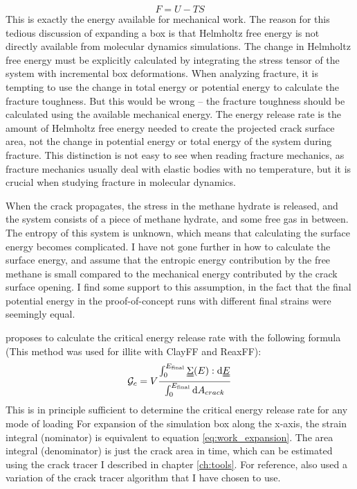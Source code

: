 \begin{equation}
	F = U - TS
\end{equation}
%
This is exactly the energy available for mechanical work. The reason for this tedious discussion of expanding a box is that Helmholtz free energy is not directly available from molecular dynamics simulations. The change in Helmholtz free energy must be explicitly calculated by integrating the stress tensor of the system with incremental box deformations. When analyzing fracture, it is tempting to use the change in total energy or potential energy to calculate the fracture toughness. But this would be wrong -- the fracture toughness should be calculated using the available mechanical energy. The energy release rate is the amount of Helmholtz free energy needed to create the projected crack surface area, not the change in potential energy or total energy of the system during fracture. This distinction is not easy to see when reading fracture mechanics, as fracture mechanics usually deal with elastic bodies with no temperature, but it is crucial when studying fracture in molecular dynamics.

When the crack propagates, the stress in the methane hydrate is released, and the system consists of a piece of methane hydrate, and some free gas in between. The entropy of this system is unknown, which means that calculating the surface energy becomes complicated. I have not gone further in how to calculate the surface energy, and assume that the entropic energy contribution by the free methane is small compared to the mechanical energy contributed by the crack surface opening. I find some support to this assumption, in the fact that the final potential energy in the proof-of-concept runs with different final strains were seemingly equal.


\citet{Hantal2014} proposes to calculate the critical energy release rate with the following formula (This method was used for illite with ClayFF and ReaxFF):
\begin{equation}
	\mathcal{G}_c = V \frac{\int_0^{E_{\text{final}}}\uuline{\Sigma}(E) : \dd \uuline{E}}{\int_0^{E_{\text{final}}} \dd A_{crack}}
	\label{eq:hantal_critical_energy_release_rate}
\end{equation}
%
This is in principle sufficient to determine the critical energy release rate for any mode of loading
For expansion of the simulation box along the x-axis, the strain integral (nominator) is equivalent to equation \ref{eq:work_expansion}. The area integral (denominator) is just the crack area in time, which can be estimated using the crack tracer I described in chapter \ref{ch:tools}. For reference, \citet{Hantal2014} also used a variation of the crack tracer algorithm that I have chosen to use.

